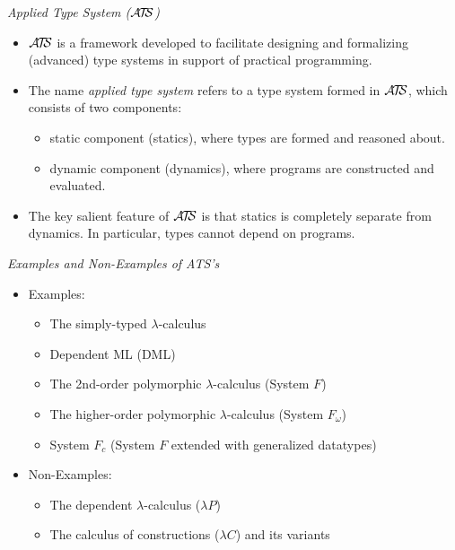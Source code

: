 \documentclass[pdf]{prosper}
\begin{document}
\begin{slide}{\em Applied Type System ($\mbox{$\cal A\kern-1.5pt T\kern-3pt S$}$)}
\begin{itemize}
\item
$\mbox{$\cal A\kern-1.5pt T\kern-3pt S$}$ is a framework developed to facilitate designing and
formalizing (advanced) type systems in support of practical
programming.
\item
The name {\em applied type system} refers to a type system formed in
$\mbox{$\cal A\kern-1.5pt T\kern-3pt S$}$, which consists of two components:
\begin{itemize}
\item
static component (statics), where types are formed and reasoned about.
\item
dynamic component (dynamics), where programs are constructed and evaluated.
\end{itemize}
\item
The key salient feature of $\mbox{$\cal A\kern-1.5pt T\kern-3pt S$}$ is that statics is completely separate
from dynamics. In particular, types cannot depend on programs.
\end{itemize}
\end{slide}
\begin{slide}{\em Examples and Non-Examples of ATS's}
\begin{itemize}

\item Examples:
\begin{itemize}
\item
The simply-typed $\lambda$-calculus
\item Dependent ML (DML)
\item
The 2nd-order polymorphic $\lambda$-calculus (System $F$)
\item
The higher-order polymorphic $\lambda$-calculus (System $F_{\omega}$)
\item
System $F_c$ (System $F$ extended with generalized datatypes)
\end{itemize}

\item Non-Examples:
\begin{itemize}
\item The dependent $\lambda$-calculus ($\lambda P$)
\item The calculus of constructions ($\lambda C$) and its variants
\end{itemize}

\end{itemize}
\end{slide}
\def\sc{{\it sc}}
\def\basesort{b}
\end{document}
